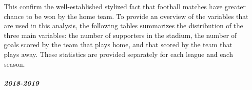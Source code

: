 \documentclass[
]{article}
\newenvironment{Shaded}{\begin{snugshade}}{\end{snugshade}}
\newcommand{\CommentTok}[1]{\textcolor[rgb]{0.56,0.35,0.01}{\textit{#1}}}
\newcommand{\DataTypeTok}[1]{\textcolor[rgb]{0.13,0.29,0.53}{#1}}
\newcommand{\DecValTok}[1]{\textcolor[rgb]{0.00,0.00,0.81}{#1}}
\newcommand{\KeywordTok}[1]{\textcolor[rgb]{0.13,0.29,0.53}{\textbf{#1}}}
\newcommand{\NormalTok}[1]{#1}
\newcommand{\OperatorTok}[1]{\textcolor[rgb]{0.81,0.36,0.00}{\textbf{#1}}}
\newcommand{\StringTok}[1]{\textcolor[rgb]{0.31,0.60,0.02}{#1}}
\begin{document}
This confirm the well-established stylized fact that football matches
have greater chance to be won by the home team. To provide an overview
of the variables that are used in this analysis, the following tables
summarizes the distribution of the three main variables: the number of
supporters in the stadium, the number of goals scored by the team that
plays home, and that scored by the team that plays away. These
statistics are provided separately for each league and each season.

\begin{Shaded}
\end{Shaded}

\hypertarget{section}{%
\paragraph{}\label{section}}

\hypertarget{section-1}{%
\subparagraph{2018-2019}\label{section-1}}
\end{document}
